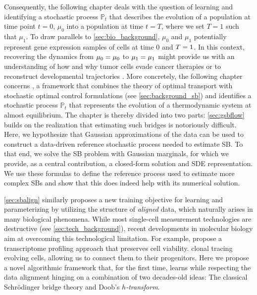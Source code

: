 Consequently, the following chapter deals with the question of learning and identifying a stochastic process $\mathbb{P}_t$ that describes the evolution of a population at time point $t=0$, $\mu_0$ into a population at time $t=T$, where we set $T=1$ such that $\mu_1$.
To draw parallels to \cref{sec:bio_background}, $\mu_0$ and $\mu_1$ potentially represent gene expression samples of cells at time $0$ and $T=1$. In this context, recovering the dynamics from $\mu_0 = \mu_0$ to $\mu_1 = \mu_1$ might provide us with an understanding of how and why tumor cells evade cancer therapies \citep{frangieh2021multimodal} or to reconstruct developmental trajectories \citep{schiebinger2019optimal}.
More concretely, the following chapter concerns , a framework that combines the theory of optimal transport with stochastic optimal control formulations (see \cref{sec:background_sb}) and identifies a stochastic process $\mathbb{P}_t$ that represents the evolution of a thermodynamic system at almost equilibrium. 
The chapter is thereby divided into two parts: 
\cref{sec:gsbflow} builds on the realization that estimating such bridges is notoriously difficult. Here, we hypothesize that Gaussian approximations of the data can be used to construct a data-driven reference stochastic process needed to estimate SB. To that end, we solve the \acrshort{SB} problem with Gaussian marginals, for which we provide, as a central contribution, a closed-form solution and SDE representation. We use these formulas to define the reference process used to estimate more complex SBs and show that this does indeed help with its numerical solution.

\cref{sec:sbalign} similarly proposes a new training objective for learning and parameterizing  by utilizing the structure of \emph{aligned} data, which naturally arises in many biological phenomena.
While most single-cell measurement technologies are destructive (see \cref{sec:tech_background}), recent developments in molecular biology aim at overcoming this technological limitation. For example, \citet{chen2022live} propose a transcriptome profiling approach that preserves cell viability. \citet{weinreb2020lineage} clonal tracing evolving cells, allowing us to connect them to their progenitors.
Here we propose a novel algorithmic framework that, for the first time, learns  while respecting the data alignment hinging on a combination of two decades-old ideas: The classical Schr{\"o}dinger bridge theory and Doob's \emph{$h$-transform}.

